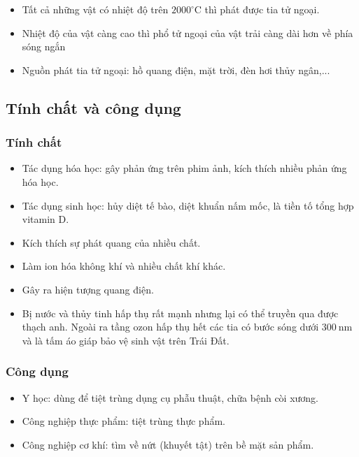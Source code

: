 \begin{itemize}
	\item Tất cả những vật có nhiệt độ trên $2000^\circ \text{C}$ thì phát được tia tử ngoại.
	\item Nhiệt độ của vật càng cao thì phổ tử ngoại của vật trải càng dài hơn về phía sóng ngắn
	\item Nguồn phát tia tử ngoại: hồ quang điện, mặt trời, đèn hơi thủy ngân,...
\end{itemize}

\subsection{Tính chất và công dụng}

\subsubsection{Tính chất}

\begin{itemize}
	\item  Tác dụng hóa học: gây phản ứng trên phim ảnh, kích thích nhiều phản ứng hóa học.
	\item  Tác dụng sinh học: hủy diệt tế bào, diệt khuẩn nấm mốc, là tiền tố tổng hợp vitamin D.
	\item Kích thích sự phát quang của nhiều chất.
	\item Làm ion hóa không khí và nhiều chất khí khác. \item Gây ra hiện tượng quang điện.
	\item Bị nước và thủy tinh hấp thụ rất mạnh nhưng lại có thể truyền qua được thạch anh. Ngoài ra tầng ozon hấp thụ hết các tia có bước sóng dưới $300\ \text{nm}$ và là tấm áo giáp bảo vệ sinh vật trên Trái Đất.
\end{itemize}

\subsubsection{Công dụng}

\begin{itemize}
	\item Y học: dùng để tiệt trùng dụng cụ phẫu thuật, chữa bệnh còi xương.
	\item Công nghiệp thực phẩm: tiệt trùng thực phẩm.
	\item Công nghiệp cơ khí: tìm về nứt (khuyết tật) trên bề mặt sản phẩm.
\end{itemize}